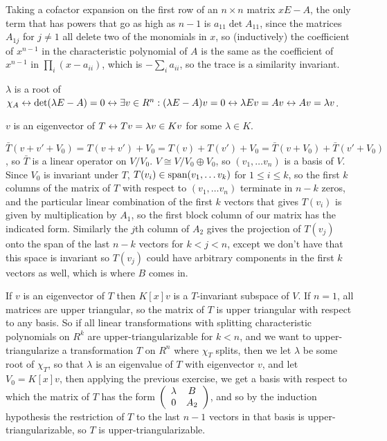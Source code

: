 \documentclass[11pt, oneside]{article}   	%
\begin{document}
\item Taking a cofactor expansion on the first row of an $n\times n$ matrix $xE - A$, the only term that has powers that go as high as $n-1$ is $a_{11}\det A_{11}$, since the matrices $A_{1j}$ for $j \not = 1$ all delete two of the monomials in $x$, so (inductively) the coefficient of $x^{n-1}$ in the characteristic polynomial of $A$ is the same as the coefficient of $x^{n-1}$ in $\prod_i(x-a_{ii})$, which is $-\sum_ia_{ii}$, so the trace is a similarity invariant. 
\item $\lambda$ is a root of $\chi_A \leftrightarrow \det(\lambda E - A) = 0 \leftrightarrow \exists v \in R^n: (\lambda E - A)v = 0 \leftrightarrow \lambda Ev = Av \leftrightarrow Av = \lambda v$.

$v$ is an eigenvector of $T \leftrightarrow Tv = \lambda v \in Kv$ for some $\lambda \in K$.
\item $\bar{T}(v + v' + V_0) = T(v + v') + V_0 = T(v) + T(v') + V_0 = \bar{T}(v + V_0) + \bar{T}(v' + V_0)$, so $\bar{T}$ is a linear operator on $V / V_0$. $V \cong V/V_0 \oplus V_0$, so $(v_1, \ldots v_n)$ is a basis of $V$. Since $V_0$ is invariant under $T$, $T(v_i) \in \text{span}(v_1, \ldots v_k)$ for $1 \le i \le k$, so the first $k$ columns of the matrix of $T$ with respect to $(v_1, \ldots v_n)$ terminate in $n-k$ zeros, and the particular linear combination of the first $k$ vectors that gives $T(v_i)$ is given by multiplication by $A_1$, so the first block column of our matrix has the indicated form. Similarly the $j$th column of $A_2$ gives the projection of $T(v_j)$ onto the span of the last $n-k$ vectors for $k < j < n$, except we don't have that this space is invariant so $T(v_j)$ could have arbitrary components in the first $k$ vectors as well, which is where $B$ comes in.   
\item If $v$ is an eigenvector of $T$ then $K[x]v$ is a $T$-invariant subspace of $V$. If $n=1$, all matrices are upper triangular, so the matrix of $T$ is upper triangular with respect to any basis. So if all linear transformations with splitting characteristic polynomials on $R^k$ are upper-triangularizable for $k < n$, and we want to upper-triangularize a transformation $T$ on $R^n$ where $\chi_T$ splits, then we let $\lambda$ be some root of $\chi_T$, so that $\lambda$ is an eigenvalue of $T$ with eigenvector $v$, and let $V_0 = K[x]v$, then applying the previous exercise, we get a basis with respect to which the matrix of $T$ has the form $\left( \begin{array}{ccc} \lambda & B \\ 0 & A_2 \end{array} \right)$, and so by the induction hypothesis the restriction of $T$ to the last $n-1$ vectors in that basis is upper-triangularizable, so $T$ is upper-triangularizable.
\end{document}
